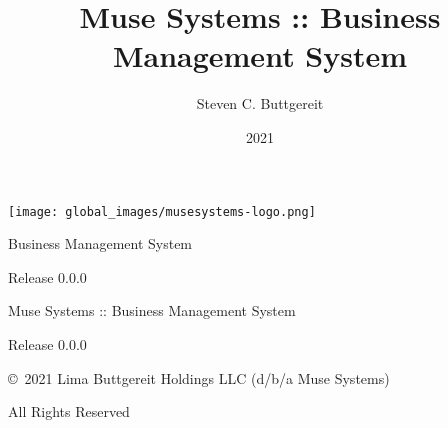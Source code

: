 \documentclass[10pt,letterpaper]{book}
\author{Steven C. Buttgereit}
\title{Muse Systems :: Business Management System}
\date{2021}
\begin{document}
\begin{titlepage}
    \vspace*{4cm}

    \centering
    \texttt{[image: global\_images/musesystems-logo.png]}

    \vspace*{1cm}

    \Huge{\textsf{Business Management System}}

    \vspace*{2cm}
    \large{Release 0.0.0}
\end{titlepage}
\pagestyle{empty}
\centerline{Muse Systems :: Business Management System}
\centerline{Release 0.0.0}
\vspace{2cm}
\centerline{\copyright~2021 Lima Buttgereit Holdings LLC (d/b/a Muse Systems)}
\centerline{All Rights Reserved}
\tableofcontents
\mainmatter


\end{document}
